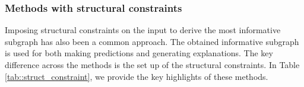 \subsubsection{Methods with structural constraints}
\label{subsec:sourav_: SE- structural-constr}
Imposing structural constraints on the input to derive the most informative subgraph has also been a common approach. The obtained informative subgraph is used for both making predictions and generating explanations. The key difference across the methods is the set up of the structural constraints. In Table \ref{tab::struct_constraint}, we provide the key highlights of these methods.

